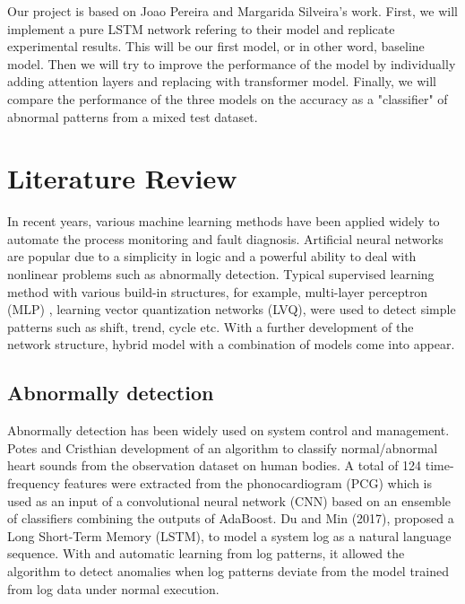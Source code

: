 \documentclass{article}
\begin{document}
Our project is based on Joao Pereira and Margarida Silveira's work. First, we will implement a pure LSTM network refering to their model and replicate experimental results. This will be our first model, or in other word, baseline model. Then we will try to improve the performance of the model by individually adding attention layers and replacing with transformer model. Finally, we will compare the performance of the three models on the accuracy as a "classifier" of abnormal patterns from a mixed test dataset. 

\section{Literature Review}
In recent years, various machine learning methods have been applied widely to automate the process monitoring and fault diagnosis. Artificial neural networks are popular due to a simplicity in logic and a powerful ability to deal with nonlinear problems such as abnormally detection. Typical supervised learning method with various build-in structures, for example, multi-layer perceptron (MLP) \cite{AuthorSI}, learning vector quantization networks (LVQ), were used to detect simple patterns such as shift, trend, cycle etc. With a further development of the network structure, hybrid model with a combination of models come into appear.

\subsection{Abnormally detection}
Abnormally detection has been widely used on system control and management. Potes and Cristhian development of an algorithm to classify normal/abnormal heart sounds from the observation dataset on human bodies. A total of 124 time-frequency features were extracted from the phonocardiogram (PCG) which is used as an input of a convolutional neural network (CNN) based on an ensemble of classifiers combining the outputs of AdaBoost. \cite{AuthorPotes} Du and Min (2017), proposed a Long Short-Term
Memory (LSTM), to model a system log as a natural language sequence. With and automatic learning from log patterns, it allowed the algorithm to detect anomalies when log patterns deviate from the model trained from log data under normal execution. \cite{AuthorDu}
\end{document}
